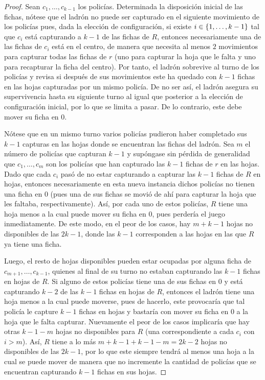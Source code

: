 \begin{proof}
    Sean $c_1,\dots, c_{k-1}$ los polic\'ias. Determinada la disposici\'on
    inicial de las fichas, n\'otese que el ladr\'on no puede ser capturado en el
    siguiente movimiento de los polic\'ias pues, dada la elecci\'on de
    configuraci\'on, si existe $i\in\{1,\dots, k-1\}$ tal que $c_i$ est\'a
    capturando a $k-1$ de las fichas de $R$, entonces necesariamente una de las
    fichas de $c_i$ est\'a en el centro, de manera que necesita al menos $2$
    movimientos para capturar todas las fichas de $r$ (uno para capturar la hoja
    que le falta y uno para recapturar la ficha del centro). Por tanto, el
    ladr\'on sobrevive al turno de los polic\'ias y revisa si despu\'es de sus
    movimientos este ha quedado con $k-1$ fichas en las hojas capturadas por un
    mismo polic\'ia. De no ser as\'i, el ladr\'on asegura su supervivencia hasta
    su siguiente turno al igual que posterior a la elecci\'on de configuraci\'on
    inicial, por lo que se limita a pasar. De lo contrario, este debe mover su
    ficha en $0$.
    
    N\'otese que en un mismo turno varios polic\'ias pudieron haber completado
    sus $k-1$ capturas en las hojas donde se encuentran las fichas del ladr\'on.
    Sea $m$ el n\'umero de polic\'ias que capturan $k-1$ y sup\'ongase sin
    p\'erdida de generalidad que $c_{1},\dots, c_{m}$ son los polic\'ias que han
    capturado las $k-1$ fichas de $r$ en las hojas. Dado que cada $c_{i}$ pas\'o
    de no estar capturando a capturar las $k-1$ fichas de $R$ en hojas, entonces
    necesariamente en esta nueva instancia dichos polic\'ias no tienen una ficha
    en $0$ (pues una de sus fichas se movi\'o de ah\'i para capturar la hoja que
    les faltaba, respectivamente). As\'i, por cada uno de estos polic\'ias, $R$
    tiene una hoja menos a la cual puede mover su ficha en $0$, pues perder\'ia
    el juego inmediatamente. De este modo, en el peor de los casos, hay $m+k-1$
    hojas no disponibles de las $2k-1$, donde las $k-1$ corresponden a las hojas
    en las que $R$ ya tiene una ficha.

   Luego, el resto de hojas disponibles pueden estar ocupadas por alguna ficha
   de  $c_{{m+1}},\dots,c_{{k-1}}$, quienes al final de su turno no estaban
   capturando las $k-1$ fichas en hojas de $R$. Si alguno de estos polic\'ias
   tiene una de sus fichas en $0$ y est\'a capturando $k-2$ de las $k-1$ fichas
   en hojas de $R$, entonces el ladr\'on tiene una hoja menos a la cual puede
   moverse, pues de hacerlo, este provocar\'ia que tal polic\'ia le capture
   $k-1$ fichas en hojas y bastar\'ia con mover su ficha en $0$ a la hoja que le
   falta capturar. Nuevamente el peor de los casos implicar\'ia que hay otras
   $k-1-m$ hojas no disponibles para $R$ (una correspondiente a cada $c_i$ con
   $i>m$). As\'i, $R$ tiene a lo m\'as $m+k-1+k-1-m=2k-2$ hojas no disponibles
   de las $2k-1$, por lo que este siempre tendr\'a al menos una hoja a la cual
   se puede mover de manera que no incremente la cantidad de polic\'ias que se
   encuentran capturando $k-1$ fichas en sus hojas.


\end{proof}
